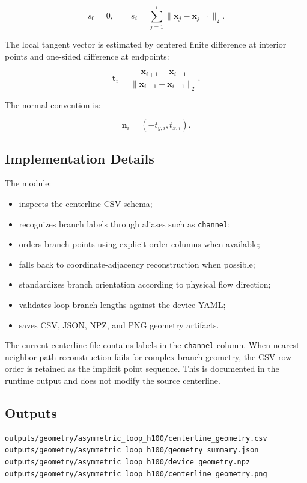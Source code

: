 \[
s_0 = 0,
\qquad
s_i = \sum_{j=1}^{i}\|\mathbf{x}_j-\mathbf{x}_{j-1}\|_2.
\]

The local tangent vector is estimated by centered finite difference at interior
points and one-sided difference at endpoints:

\[
\mathbf{t}_i =
\frac{\mathbf{x}_{i+1}-\mathbf{x}_{i-1}}
{\|\mathbf{x}_{i+1}-\mathbf{x}_{i-1}\|_2}.
\]

The normal convention is:

\[
\mathbf{n}_i = (-t_{y,i}, t_{x,i}).
\]

\subsection{Implementation Details}

The module:

\begin{itemize}
  \item inspects the centerline CSV schema;
  \item recognizes branch labels through aliases such as \texttt{channel};
  \item orders branch points using explicit order columns when available;
  \item falls back to coordinate-adjacency reconstruction when possible;
  \item standardizes branch orientation according to physical flow direction;
  \item validates loop branch lengths against the device YAML;
  \item saves CSV, JSON, NPZ, and PNG geometry artifacts.
\end{itemize}

The current centerline file contains labels in the \texttt{channel} column. When
nearest-neighbor path reconstruction fails for complex branch geometry, the CSV
row order is retained as the implicit point sequence. This is documented in the
runtime output and does not modify the source centerline.

\subsection{Outputs}

\begin{verbatim}
outputs/geometry/asymmetric_loop_h100/centerline_geometry.csv
outputs/geometry/asymmetric_loop_h100/geometry_summary.json
outputs/geometry/asymmetric_loop_h100/device_geometry.npz
outputs/geometry/asymmetric_loop_h100/centerline_geometry.png
\end{verbatim}

